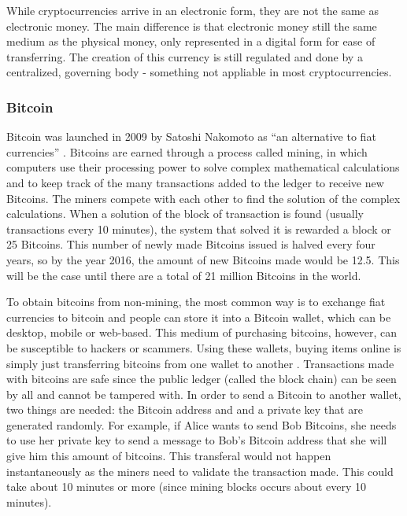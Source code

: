 \documentclass{acm_proc_article-sp}
\begin{document}
While cryptocurrencies arrive in an electronic form, they are not the same as electronic money. The main difference is that electronic money still the same medium as the physical money, only represented in a digital form for ease of transferring. The creation of this currency is still regulated and done by a centralized, governing body - something not appliable in most cryptocurrencies.


\subsubsection{Bitcoin}

Bitcoin was launched in 2009 by Satoshi Nakomoto as ``an alternative to fiat currencies'' \cite{Worldbank:2014}. Bitcoins are earned through a process called mining, in which computers use their processing power to solve complex mathematical calculations and to keep track of the many transactions added to the ledger to receive new Bitcoins. The miners compete with each other to find the solution of the complex calculations.  When a solution of the block of transaction is found (usually transactions every 10 minutes), the system that solved it is rewarded a block or 25 Bitcoins. This number of newly made Bitcoins issued is halved every four years, so by the year 2016, the amount of new Bitcoins made would be 12.5. This will be the case until there are a total of 21 million Bitcoins in the world.

To obtain bitcoins from non-mining, the most common way is to exchange fiat currencies to bitcoin and people can store it into a Bitcoin wallet, which can be desktop, mobile or web-based. This medium of purchasing bitcoins, however, can be susceptible to hackers or scammers. Using these wallets, buying items online is simply just transferring bitcoins from one wallet to another \cite{Coindesk:03062014b}. Transactions made with bitcoins are safe since the public ledger (called the block chain) can be seen by all and cannot be tampered with. In order to send a Bitcoin to another wallet, two things are needed: the Bitcoin address and and a private key that are generated randomly. For example, if Alice wants to send Bob Bitcoins, she needs to use her private key to send a message to Bob's Bitcoin address that she will give him this amount of bitcoins. This transferal would not happen instantaneously as the miners need to validate the transaction made. This could take about 10 minutes or more (since mining blocks occurs about every 10 minutes).
\end{document}
